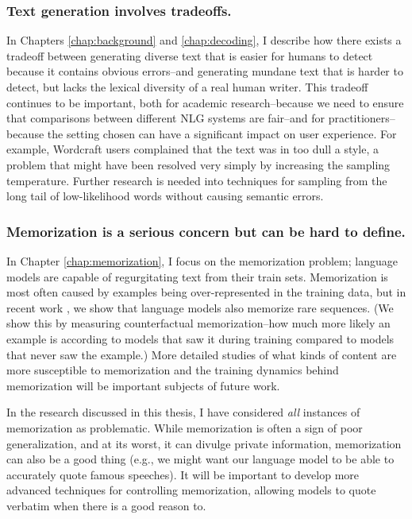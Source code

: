 \subsubsection{Text generation involves tradeoffs.}
	In Chapters \ref{chap:background} and \ref{chap:decoding}, I describe how there exists a tradeoff between generating diverse text that is easier for humans to detect because it contains obvious errors--and generating mundane text that is harder to detect, but lacks the lexical diversity of a real human writer.
	This tradeoff continues to be important, both for academic research--because we need to ensure that  comparisons between different NLG systems are fair--and for practitioners--because the setting chosen can have a significant impact on user experience.
	For example, Wordcraft users complained that the text was in too dull a style, a problem that might have been resolved very simply by increasing the sampling temperature.
	Further research is needed into techniques for sampling from the long tail of low-likelihood words without causing semantic errors.

\subsubsection{Memorization is a serious concern but can be hard to define.}
	In Chapter \ref{chap:memorization}, I focus on the memorization problem; language models are capable of regurgitating text from their train sets.
	Memorization is most often caused by examples being over-represented in the training data, but in recent work \citep{zhang2021counterfactual}, we show that language models also memorize rare sequences.
	(We show this by measuring counterfactual memorization--how much more likely an example is according to models that saw it during training compared to models that never saw the example.)
	More detailed studies of what kinds of content are more susceptible to memorization and the training dynamics behind memorization will be important subjects of future work.

	In the research discussed in this thesis, I have considered \textit{all} instances of memorization as problematic.
	While memorization is often a sign of poor generalization, and at its worst, it can divulge private information, memorization can also be a good thing (e.g., we might want our language model to be able to accurately quote famous speeches).
	It will be important to develop more advanced techniques for controlling memorization, allowing models to quote verbatim when there is a good reason to.

